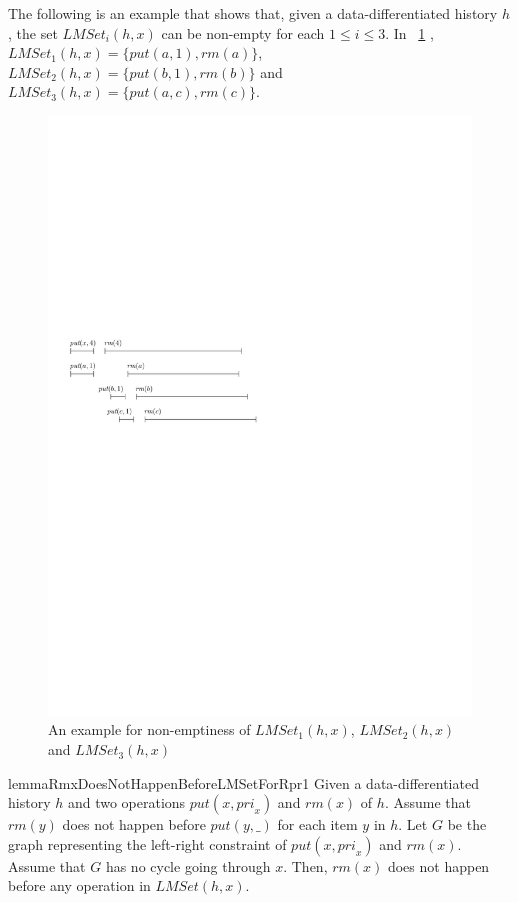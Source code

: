 \documentclass{llncs}
\begin{document}
The following is an example that shows that, given a data-differentiated history $h$, the set $\textit{LMSet}_i(h,x)$ can be non-empty for each $1 \leq i \leq 3$. In \figurename~\ref{fig:his nobound of LMSet} , $\textit{LMSet}_1(h,x) = \{ \textit{put}(a,1),\textit{rm}(a) \}$, $\textit{LMSet}_2(h,x) = \{ \textit{put}(b,1),\textit{rm}(b) \}$ and $\textit{LMSet}_3(h,x) = \{ \textit{put}(a,c),\textit{rm}(c) \}$.

\begin{figure}[htbp]
  \centering
  \includegraphics[width=0.5 \textwidth]{PIC_HIS_NOBOUNDOF_LMSET.pdf}
  \caption{An example for non-emptiness of $\textit{LMSet}_1(h,x)$, $\textit{LMSet}_2(h,x)$ and $\textit{LMSet}_3(h,x)$}
  \label{fig:his nobound of LMSet}
\end{figure}


\begin{restatable}{lemma}{RmxDoesNotHappenBeforeLMSetForRpr1}
\label{lemma:Rmx does not happen before LMSet for Rpr1}
Given a data-differentiated history $h$ and two operations $\textit{put}(x,\textit{pri}_x)$ and $\textit{rm}(x)$ of $h$. %
Assume that $\textit{rm}(y)$ does not happen before $\textit{put}(y,\_)$ for each item $y$ in $h$. Let $G$ be the graph representing the left-right constraint of $\textit{put}(x,\textit{pri}_x)$ and $\textit{rm}(x)$. Assume that $G$ has no cycle going through $x$. Then, $\textit{rm}(x)$ does not happen before any operation in $\textit{LMSet}(h,x)$.
\end{restatable}
\end{document}
